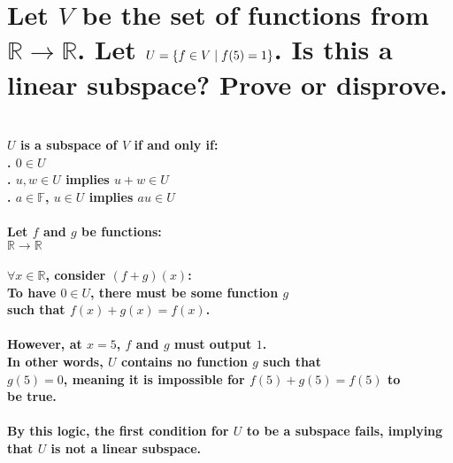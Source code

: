 \documentclass{article}
\begin{document}
\newpage

\section{Let $V$ be the set of functions from $\mathds{R} \rightarrow \mathds{R}$. Let $U = \{f \in V \thickspace | \thickspace f(5) = 1\}$. Is this a linear subspace? Prove or disprove.}

\paragraph{\large
\\$U$ is a subspace of $V$ if and only if:
\\. $0 \in U$
\\. $u,w \in U$ implies $u + w \in U$
\\. $a \in \mathds{F}$, $u \in U$ implies $au \in U$}

\paragraph{\large
Let $f$ and $g$ be functions:
\\\indent $\mathds{R} \rightarrow \mathds{R}$}

\paragraph{\large
$\forall x \in \mathds{R}$, consider $(f + g)(x)$:
\\\indent To have $0 \in U$, there must be some function $g$ 
\\\indent such that $f(x) + g(x) = f(x)$.}

\paragraph{\large
However, at $x = 5$, $f$ and $g$ must output $1$.
\\\indent In other words, $U$ contains no function $g$ such that 
\\\indent $g(5) = 0$, meaning it is impossible for $f(5) + g(5) = f(5)$ to 
\\\indent be true.}

\paragraph{\large
By this logic, the first condition for $U$ to be a subspace fails, implying that $U$ is not a linear subspace.}
\end{document}
